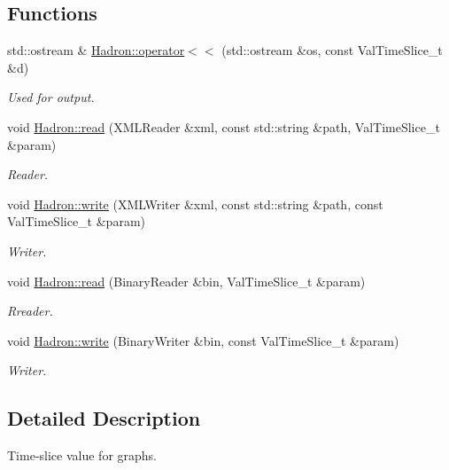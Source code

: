 \subsection*{Functions}
\begin{DoxyCompactItemize}
\item 
std\+::ostream \& \mbox{\hyperlink{namespaceHadron_ab6f642c04562e34b1b2aa6e4bcfa60e7}{Hadron\+::operator$<$$<$}} (std\+::ostream \&os, const Val\+Time\+Slice\+\_\+t \&d)
\begin{DoxyCompactList}\small\item\em Used for output. \end{DoxyCompactList}\item 
void \mbox{\hyperlink{namespaceHadron_aa4df93329eeddeec176cd9df5abe9ce1}{Hadron\+::read}} (X\+M\+L\+Reader \&xml, const std\+::string \&path, Val\+Time\+Slice\+\_\+t \&param)
\begin{DoxyCompactList}\small\item\em Reader. \end{DoxyCompactList}\item 
void \mbox{\hyperlink{namespaceHadron_ab3f6a936fc8ba9b50904aca066146f48}{Hadron\+::write}} (X\+M\+L\+Writer \&xml, const std\+::string \&path, const Val\+Time\+Slice\+\_\+t \&param)
\begin{DoxyCompactList}\small\item\em Writer. \end{DoxyCompactList}\item 
void \mbox{\hyperlink{namespaceHadron_ad59dd6905268b9fa8e1bf10fef767b9b}{Hadron\+::read}} (Binary\+Reader \&bin, Val\+Time\+Slice\+\_\+t \&param)
\begin{DoxyCompactList}\small\item\em Rreader. \end{DoxyCompactList}\item 
void \mbox{\hyperlink{namespaceHadron_a7b503b82bc88cdec19d5b7173957b35e}{Hadron\+::write}} (Binary\+Writer \&bin, const Val\+Time\+Slice\+\_\+t \&param)
\begin{DoxyCompactList}\small\item\em Writer. \end{DoxyCompactList}\end{DoxyCompactItemize}


\subsection{Detailed Description}
Time-\/slice value for graphs. 



